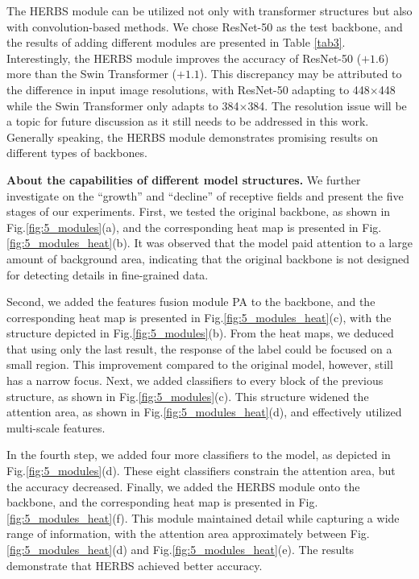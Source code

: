 \documentclass[journal]{IEEEtran}
\begin{document}
The HERBS module can be utilized not only with transformer structures but also with convolution-based methods. We chose ResNet-50 as the test backbone, and the results of adding different modules are presented in Table \ref{tab3}. Interestingly, the HERBS module improves the accuracy of ResNet-50 ($+1.6$) more than the Swin Transformer ($+1.1$). This discrepancy may be attributed to the difference in input image resolutions, with ResNet-50 adapting to 448$\times$448 while the Swin Transformer only adapts to 384$\times$384. The resolution issue will be a topic for future discussion as it still needs to be addressed in this work. Generally speaking, the HERBS module demonstrates promising results on different types of backbones.

\textbf{About the capabilities of different model structures.} We further investigate on the ``growth'' and ``decline'' of receptive fields and present the five stages of our experiments. First, we tested the original backbone, as shown in Fig.\ref{fig:5_modules}(a), and the corresponding heat map is presented in Fig.\ref{fig:5_modules_heat}(b). It was observed that the model paid attention to a large amount of background area, indicating that the original backbone is not designed for detecting details in fine-grained data. 

Second, we added the features fusion module PA to the backbone, and the corresponding heat map is presented in Fig.\ref{fig:5_modules_heat}(c), with the structure depicted in Fig.\ref{fig:5_modules}(b). From the heat maps, we deduced that using only the last result, the response of the label could be focused on a small region. This improvement compared to the original model, however, still has a narrow focus. Next, we added classifiers to every block of the previous structure, as shown in Fig.\ref{fig:5_modules}(c). This structure widened the attention area, as shown in Fig.\ref{fig:5_modules_heat}(d), and effectively utilized multi-scale features. 

In the fourth step, we added four more classifiers to the model, as depicted in Fig.\ref{fig:5_modules}(d). These eight classifiers constrain the attention area, but the accuracy decreased. Finally, we added the HERBS module onto the backbone, and the corresponding heat map is presented in Fig.\ref{fig:5_modules_heat}(f). This module maintained detail while capturing a wide range of information, with the attention area approximately between Fig.\ref{fig:5_modules_heat}(d) and Fig.\ref{fig:5_modules_heat}(e). The results demonstrate that HERBS achieved better accuracy.
\end{document}
